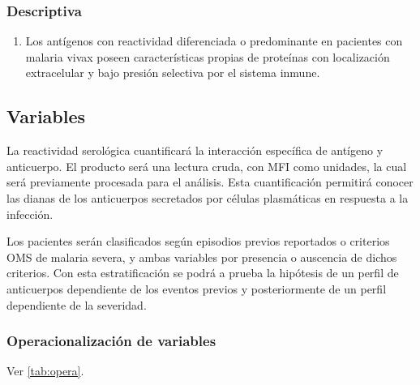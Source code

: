 \documentclass[]{article}
\providecommand{\tightlist}{%
  \setlength{\itemsep}{0pt}\setlength{\parskip}{0pt}}
\begin{document}
\subsubsection{Descriptiva}\label{descriptiva}

\begin{enumerate}
\def\labelenumi{\arabic{enumi}.}
\setcounter{enumi}{2}
\tightlist
\item
  Los antígenos con reactividad diferenciada o predominante en pacientes
  con malaria vivax poseen características propias de proteínas con
  localización extracelular y bajo presión selectiva por el sistema
  inmune.
\end{enumerate}

\subsection{Variables}\label{variables}

La reactividad serológica cuantificará la interacción específica de
antígeno y anticuerpo. El producto será una lectura cruda, con MFI como
unidades, la cual será previamente procesada para el análisis. Esta
cuantificación permitirá conocer las dianas de los anticuerpos
secretados por células plasmáticas en respuesta a la infección.

Los pacientes serán clasificados según episodios previos reportados o
criterios OMS de malaria severa, y ambas variables por presencia o
auscencia de dichos criterios. Con esta estratificación se podrá a
prueba la hipótesis de un perfil de anticuerpos dependiente de los
eventos previos y posteriormente de un perfil dependiente de la
severidad.

\subsubsection{Operacionalización de
variables}\label{operacionalizacion-de-variables}

Ver \autoref{tab:opera}.
\end{document}

